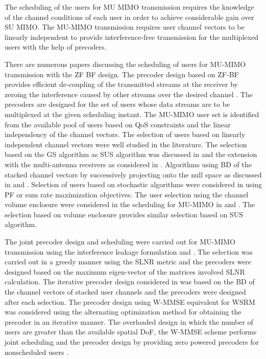 
The scheduling of the users for \ac{MU} \ac{MIMO} transmission requires the knowledge of the channel conditions of each user in order to achieve considerable gain over \ac{SU} \ac{MIMO}. The \ac{MU}-\ac{MIMO} transmission requires user channel vectors to be linearly independent to provide interference-free transmission for the multiplexed users with the help of precoders.

There are numerous papers discussing the scheduling of users for \ac{MU}-\ac{MIMO} transmission with the \ac{ZF} \ac{BF} design. The precoder design based on \ac{ZF}-\ac{BF} provides efficient de-coupling of the transmitted streams at the receiver by zeroing the interference caused by other streams over the desired channel \cite{spencer2004zero,wiesel2008zero}. The precoders are designed for the set of users whose data streams are to be multiplexed at the given scheduling instant. The \ac{MU}-\ac{MIMO} user set is identified from the available pool of users based on \ac{QoS} constraints and the linear independency of the channel vectors.
The selection of users based on linearly independent channel vectors were well studied in the literature. The selection based on the \ac{GS} algorithm as \ac{SUS} algorithm was discussed in \cite{sus2006zfbf} and the extension with the multi-antenna receivers as considered in \cite{antti_user_selection}.  Algorithms using \ac{BD} of the stacked channel vectors by successively projecting onto the null space as discussed in \cite{shen2006low} and \cite{youtuan2007improved}. Selection of users based on stochastic algorithms were considered in \cite{genetic_search} using \ac{PF} or sum rate maximization objectives. The user selection using the channel volume enclosure were considered in the scheduling for \ac{MU-MIMO} in \cite{ko2012determinant} and \cite{jin2010novel}. The selection based on volume enclosure provides similar selection based on \ac{SUS} algorithm.

The joint precoder design and scheduling were carried out for \ac{MU}-\ac{MIMO} transmission using the interference leakage formulation \cite{sadek} and \cite{leakage}. The selection was carried out in a greedy manner using the \ac{SLNR} metric and the precoders were designed based on the maximum eigen-vector of the matrices involved \ac{SLNR} calculation. The iterative precoder design considered in \cite{traniterative} was based on the \ac{BD} of the channel vectors of stacked user channels and the precoders were designed after each selection. The precoder design using \ac{W-MMSE} equivalent for \ac{WSRM} was considered using the alternating optimization method for obtaining the precoder in an iterative manner. The overloaded design in which the number of users are greater than the available spatial \ac{DoF}, the \ac{W-MMSE} scheme performs joint scheduling and the precoder design by providing zero powered precoders for nonscheduled users \cite{wmmse_shi}.

